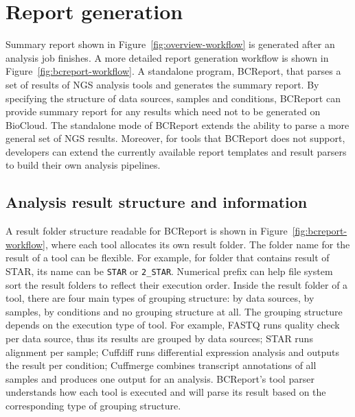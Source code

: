 \section{Report generation}
\label{s:report-generation}

Summary report shown in Figure~\ref{fig:overview-workflow} is generated after
an analysis job finishes. A more detailed report generation workflow is shown
in Figure~\ref{fig:bcreport-workflow}. A standalone program, BCReport, that
parses a set of results of NGS analysis tools and generates the summary report.
By specifying the structure of data sources, samples and conditions, BCReport
can provide summary report for any results which need not to be generated on
BioCloud. The standalone mode of BCReport extends the ability to parse a more
general set of NGS results. Moreover, for tools that BCReport does not support,
developers can extend the currently available report templates and result
parsers to build their own analysis pipelines.




\subsection{Analysis result structure and information}

A result folder structure readable for BCReport is shown in
Figure~\ref{fig:bcreport-workflow}, where each tool allocates its own result
folder. The folder name for the result of a tool can be flexible. For example,
for folder that contains result of STAR, its name can be \texttt{STAR} or
\texttt{2\_STAR}. Numerical prefix can help file system sort the result folders
to reflect their execution order. Inside the result folder of a tool, there are
four main types of grouping structure: by data sources, by samples, by
conditions and no grouping structure at all. The grouping structure depends on
the execution type of tool. For example, FASTQ runs quality check per data
source, thus its results are grouped by data sources; STAR runs alignment per
sample; Cuffdiff runs differential expression analysis and outputs the result
per condition; Cuffmerge combines transcript annotations of all samples and
produces one output for an analysis. BCReport's tool parser understands how
each tool is executed and will parse its result based on the corresponding type
of grouping structure.


